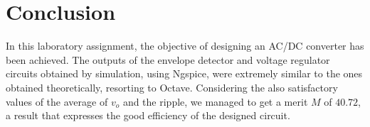 \section{Conclusion}
\label{sec:conclusion}

In this laboratory assignment, the objective of designing an AC/DC converter has been achieved. The outputs of the envelope detector and voltage regulator circuits obtained by simulation, using Ngspice, were extremely similar to the ones obtained theoretically, resorting to Octave. Considering the also satisfactory values of the average of $v_o$ and the ripple, we managed to get a merit $M$ of $40.72$, a result that expresses the good efficiency of the designed circuit.
